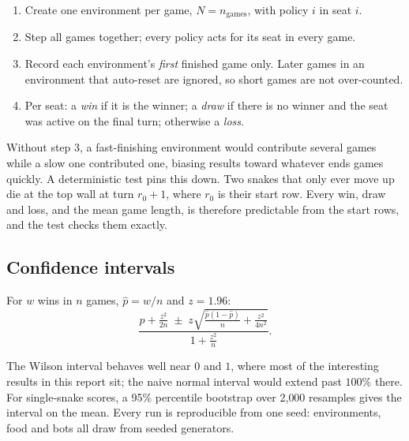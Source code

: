\begin{algbox}
\begin{enumerate}
\item Create one environment per game, $N = n_{\text{games}}$, with policy $i$ in seat $i$.
\item Step all games together; every policy acts for its seat in every game.
\item Record each environment's \emph{first} finished game only. Later games in an
  environment that auto-reset are ignored, so short games are not over-counted.
\item Per seat: a \emph{win} if it is the winner; a \emph{draw} if there is no winner and
  the seat was active on the final turn; otherwise a \emph{loss}.
\end{enumerate}
\end{algbox}

\begin{warnbox}
Without step 3, a fast-finishing environment would contribute several games while a slow
one contributed one, biasing results toward whatever ends games quickly. A deterministic
test pins this down. Two snakes that only ever move up die at the top wall at turn
$r_0+1$, where $r_0$ is their start row. Every win, draw and loss, and the mean game
length, is therefore predictable from the start rows, and the test checks them exactly.
\end{warnbox}

\subsection{Confidence intervals}

\begin{defbox}
For $w$ wins in $n$ games, $\hat p = w/n$ and $z = 1.96$:
\[
  \frac{\hat p + \frac{z^2}{2n} \;\pm\; z\sqrt{\frac{\hat p(1-\hat p)}{n} + \frac{z^2}{4n^2}}}
       {1 + \frac{z^2}{n}} .
\]
\end{defbox}

The Wilson interval behaves well near $0$ and $1$, where most of the interesting results
in this report sit; the naive normal interval would extend past $100\%$ there. For
single-snake scores, a 95\% percentile bootstrap over 2{,}000 resamples gives the interval
on the mean. Every run is reproducible from one seed: environments, food and bots all
draw from seeded generators.
